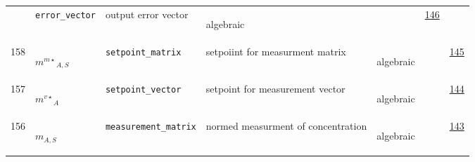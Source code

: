 \begin{longtable}{|p{1cm}|p{2.5cm}|p{4.5cm}|p{8cm}|p{3.0cm}|p{3cm}|p{1cm}|}
             & \verb|error_vector|
             & output error vector
             & \begin{lay}algebraic \end{lay}
             & $  $
             &                 \hyperlink{"e:146"}{ 146 }
                 \\
            158
             & \hypertarget{"v:158"}{ $ {{m^{m\star}}}{_{A, S}} $}
             & \verb|setpoint_matrix|
             & setpoiint for measurment matrix
             & \begin{lay}algebraic \end{lay}
             & $  $
             &                 \hyperlink{"e:145"}{ 145 }
                 \\
            157
             & \hypertarget{"v:157"}{ $ {{m^{v\star}}}{_{A}} $}
             & \verb|setpoint_vector|
             & setpoint for measurement vector
             & \begin{lay}algebraic \end{lay}
             & $  $
             &                 \hyperlink{"e:144"}{ 144 }
                 \\
            156
             & \hypertarget{"v:156"}{ $ {m}{_{A, S}} $}
             & \verb|measurement_matrix|
             & normed measurment of concentration
             & \begin{lay}algebraic \end{lay}
             & $  $
             &                 \hyperlink{"e:143"}{ 143 }
                 \\
    \end{longtable}